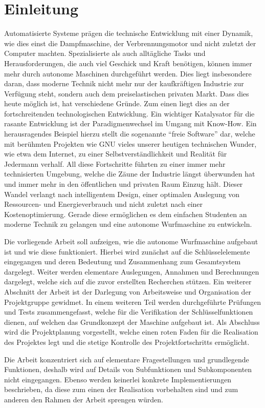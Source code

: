 \section{Einleitung}
Automatisierte Systeme prägen die technische Entwicklung mit einer Dynamik,
wie dies einst die Dampfmaschine, der Verbrennungsmotor und nicht zuletzt der
Computer machten. Spezialisierte als auch alltägliche Tasks und 
Herausforderungen, die auch viel Geschick und Kraft benötigen, können immer
mehr durch autonome Maschinen durchgeführt werden. Dies liegt insbesondere
daran, dass moderne Technik nicht mehr nur der kaufkräftigen Industrie zur
Verfügung steht, sondern auch dem preiselastischen privaten Markt. Dass dies
heute möglich ist, hat verschiedene Gründe. Zum einen liegt dies an der
fortschreitenden technologischen Entwicklung. Ein wichtiger Katalysator für
die rasante Entwicklung ist der Paradigmenwechsel im Umgang mit Know-How.
Ein herausragendes Beispiel hierzu stellt die sogenannte 
``freie Software'' dar, welche mit berühmten Projekten wie GNU vieles
unserer heutigen technischen Wunder, wie etwa dem Internet, zu einer
Selbstverständlichkeit und Realität für Jedermann verhalf.
All diese Fortschritte führten zu einer immer mehr technisierten
Umgebung, welche die Zäune der Industrie längst überwunden hat und immer
mehr in den öffentlichen und privaten Raum Einzug hält. Dieser Wandel
verlangt nach intelligentem Design, einer optimalen Auslegung von
Ressourcen- und Energieverbrauch und nicht zuletzt nach einer
Kostenoptimierung. Gerade diese ermöglichen es dem einfachen Studenten an
moderne Technik zu gelangen und eine autonome Wurfmaschine zu
entwickeln. 

Die vorliegende Arbeit soll aufzeigen, wie die autonome Wurfmaschine
aufgebaut ist und wie diese funktioniert. Hierbei wird zunächst auf die
Schlüsselelemente eingegangen und deren Bedeutung und Zusammenhang
zum Gesamtsystem dargelegt. Weiter werden elementare Auslegungen, Annahmen
und Berechnungen dargelegt, welche sich auf die zuvor erstellten Recherchen
stützen. Ein weiterer Abschnitt der Arbeit ist der Darlegung von Arbeitsweise
und Organisation der Projektgruppe gewidmet. In einem weiteren Teil werden
durchgeführte Prüfungen und Tests zusammengefasst, welche für die Verifikation
der Schlüsselfunktionen dienen, auf welchen das Grundkonzept der Maschine
aufgebaut ist. Als Abschluss wird die Projektplanung vorgestellt, welche
einen roten Faden für die Realisation des Projektes legt und die stetige
Kontrolle des Projektfortschritts ermöglicht.

Die Arbeit konzentriert sich auf elementare Fragestellungen und grundlegende
Funktionen, deshalb wird auf Details von Subfunktionen und Subkomponenten
nicht eingegangen. Ebenso werden keinerlei konkrete Implementierungen 
beschrieben, da diese zum einen der Realisation vorbehalten sind und zum
anderen den Rahmen der Arbeit sprengen würden.
